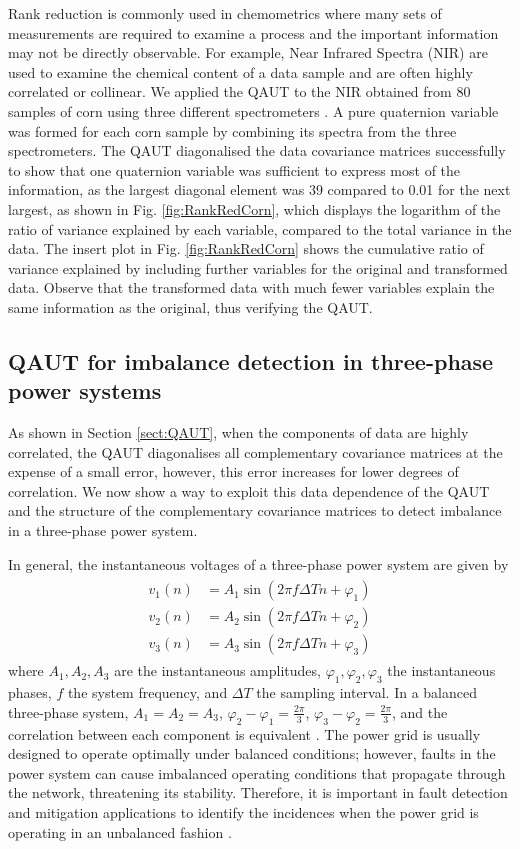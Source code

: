 \documentclass[review]{elsarticle}
\theoremstyle{plain}
\theoremstyle{remark}
\theoremstyle{plain}
\theoremstyle{definition}
\theoremstyle{prop}
\theoremstyle{definition}
\theoremstyle{plain}
\theoremstyle{plain}
\begin{document}
Rank reduction is commonly used in chemometrics where many sets of measurements are required to examine a process and the important information may not be directly observable. For example, Near Infrared Spectra (NIR) are used to examine the chemical content of a data sample and are often highly correlated or collinear. We applied the QAUT to the NIR obtained from 80 samples of corn using three different spectrometers \cite{Corndata}. 
A pure quaternion variable was formed for each corn sample by combining its spectra from the three spectrometers. The QAUT diagonalised the data covariance matrices successfully to show that one quaternion variable was sufficient to express most of the information, as the largest diagonal element was 39 compared to 0.01 for the next largest, as shown in Fig. \ref{fig:RankRedCorn}, which displays the logarithm of the ratio of variance explained by each variable, compared to the total variance in the data. The insert plot in Fig. \ref{fig:RankRedCorn} shows the cumulative ratio of variance explained by including further variables for the original and transformed data. Observe that the transformed data with much fewer variables explain the same information as the original, thus verifying the QAUT.
\subsection{QAUT for imbalance detection in three-phase power systems}
As shown in Section \ref{sect:QAUT}, when the components of data are highly correlated, the QAUT diagonalises all complementary covariance matrices at the expense of a small error, however, this error increases for lower degrees of correlation. We now show a way to exploit this data dependence of the QAUT and the structure of the complementary covariance matrices to detect imbalance in a three-phase power system. 

In general, the instantaneous voltages of a three-phase power system are given by \cite{Talebi2015a}
\begin{align}\label{eq:3phase}
\begin{array}{rl}
 v_{1}(n) &= A_1\sin(2\pi f\Delta T n + \varphi_1) \\ 
 v_{2}(n) &= A_2\sin(2\pi f\Delta T n + \varphi_2) \\ 
 v_{3}(n) &= A_3\sin(2\pi f\Delta T n + \varphi_3) 
 \end{array}
\end{align}
where $A_1, A_2, A_3$ are the instantaneous amplitudes, $\varphi_1, \varphi_2, \varphi_3$ the instantaneous phases, $f$ the system frequency, and $\Delta T$ the sampling interval. In a balanced three-phase system, $A_1=A_2=A_3$, $\varphi_2-\varphi_1=\frac{2\pi}{3}$, $\varphi_3-\varphi_2=\frac{2\pi}{3}$, and the correlation between each component is equivalent \cite{Xia2012}. 
The power grid is usually designed to operate optimally under balanced conditions; however, faults in the power system can cause imbalanced operating conditions that propagate through the network, threatening its stability. Therefore, it is important in fault detection and mitigation applications to identify the incidences when the power grid is operating in an unbalanced fashion \cite{Kanna2015}. 
\end{document}
